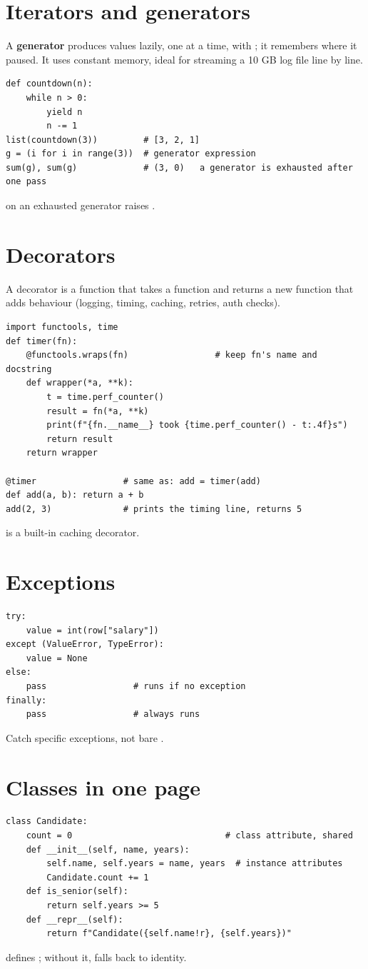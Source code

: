 \section{Iterators and generators}
A \textbf{generator} produces values lazily, one at a time, with ; it remembers where it paused. It uses constant memory, ideal for streaming a
10 GB log file line by line.
\begin{lstlisting}
def countdown(n):
    while n > 0:
        yield n
        n -= 1
list(countdown(3))         # [3, 2, 1]
g = (i for i in range(3))  # generator expression
sum(g), sum(g)             # (3, 0)   a generator is exhausted after one pass
\end{lstlisting}
 on an exhausted generator raises .

\section{Decorators}
A decorator is a function that takes a function and returns a new function that adds behaviour (logging, timing, caching, retries, auth checks).
\begin{lstlisting}
import functools, time
def timer(fn):
    @functools.wraps(fn)                 # keep fn's name and docstring
    def wrapper(*a, **k):
        t = time.perf_counter()
        result = fn(*a, **k)
        print(f"{fn.__name__} took {time.perf_counter() - t:.4f}s")
        return result
    return wrapper

@timer                 # same as: add = timer(add)
def add(a, b): return a + b
add(2, 3)              # prints the timing line, returns 5
\end{lstlisting}
 is a built-in caching decorator.

\section{Exceptions}
\begin{lstlisting}
try:
    value = int(row["salary"])
except (ValueError, TypeError):
    value = None
else:
    pass                 # runs if no exception
finally:
    pass                 # always runs
\end{lstlisting}
Catch specific exceptions, not bare .

\section{Classes in one page}
\begin{lstlisting}
class Candidate:
    count = 0                              # class attribute, shared
    def __init__(self, name, years):
        self.name, self.years = name, years  # instance attributes
        Candidate.count += 1
    def is_senior(self):
        return self.years >= 5
    def __repr__(self):
        return f"Candidate({self.name!r}, {self.years})"
\end{lstlisting}
 defines \code{==}; without it, \code{==} falls back to identity.


